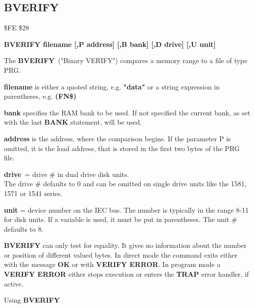 
\newpage
\subsection{BVERIFY}
\begin{description}[leftmargin=3cm,style=nextline]
\item [Token:] \$FE \$28
\item [Format:] {\bf BVERIFY filename [,P address]
                [,B bank] [,D drive] [,U unit] }
\item [Usage:]
   The {\bf BVERIFY} ("Binary VERIFY") compares a memory range to
   a file of type PRG.

   {\bf filename} is either a quoted string, e.g. {\bf "data"} or
   a string expression in parentheses, e.g. {\bf (FN\$)}

   {\bf bank} specifies the RAM bank to be used.
   If not specified the current bank, as set with the last
   {\bf BANK} statement, will be used.

   {\bf address} is the address, where the comparison begins.
   If the parameter P is omitted, it is the load address,
   that is stored in the first two bytes of the PRG file.

   {\bf drive} = drive \# in dual drive disk units. \\
   The drive \# defaults to 0 and can be omitted on single drive units
   like the 1581, 1571 or 1541 series.

   {\bf unit} = device number on the IEC bus.
   The number is typically in the range 8-11 for disk units.
   If a variable is used, it must be put in parentheses.
   The unit \# defaults to 8.

\item [Remarks:]
   {\bf BVERIFY} can only test for equality. It gives no information
   about the number or position of different valued bytes.
   In direct mode the command exits either with the message {\bf OK}
   or with {\bf VERIFY ERROR}. In program mode a {\bf VERIFY ERROR}
   either stops execution or enters the {\bf TRAP} error handler,
   if active.

\item [Example:] Using {\bf BVERIFY}
\end{description}

